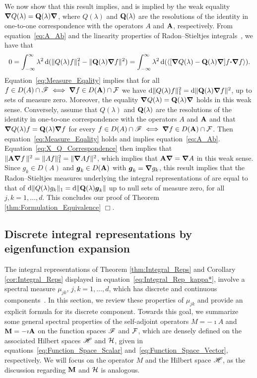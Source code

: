 \documentclass[amsa]{ipart}
\begin{document}
We now show that this result implies, and is implied by the weak
equality $\mbox{\boldmath${\nabla}$} Q(\lambda)=\mathbf{Q}(\lambda)\mbox{\boldmath${\nabla}$} $, where
$Q(\lambda)$ and $\mathbf{Q}(\lambda)$ are the resolutions of the identity in one-to-one
correspondence with the operators $A$ and $\mathbf{A}$, respectively. From
equation~\eqref{eq:A_Ab} and the linearity properties of
Radon--Stieltjes integrals~\cite{Stone:64}, we have that   
%
\begin{align}\label{eq:Measure_Eqality}
  0=\int_{-\infty}^\infty\lambda^2\,\d(\|Q(\lambda)f\|_1^2-\|\Qb(\lambda)\bnabla f\|^2)
   =\int_{-\infty}^\infty\lambda^2\,\d(\langle[\bnabla Q(\lambda)-\Qb(\lambda)\bnabla ]f\bcdot\bnabla f\rangle).
\end{align}
%
Equation~\eqref{eq:Measure_Eqality} implies that for all
$f\in D(A)\cap\mathscr{F}\iff\mbox{\boldmath${\nabla}$} f\in D(\mathbf{A})\cap\mathcal{F}$ we have
$\mathrm{d}\|Q(\lambda)f\|_1^2=\mathrm{d}\|\mathbf{Q}(\lambda)\mbox{\boldmath${\nabla}$} f\|^2$, up to sets of measure
zero. Moreover, the equality $\mbox{\boldmath${\nabla}$} Q(\lambda)=\mathbf{Q}(\lambda)\mbox{\boldmath${\nabla}$} $ holds
in this weak sense. Conversely, assume that $Q(\lambda)$ and 
$\mathbf{Q}(\lambda)$ are the resolutions of the identity in one-to-one
correspondence with the operators $A$ and $\mathbf{A}$ and that $\mbox{\boldmath${\nabla}$}
Q(\lambda)f=\mathbf{Q}(\lambda)\mbox{\boldmath${\nabla}$} f$ for every $f\in D(A)\cap\mathscr{F}\iff\mbox{\boldmath${\nabla}$} f\in D(\mathbf{A})\cap\mathcal{F}$. Then
equation~\eqref{eq:Measure_Eqality} holds and implies
equation~\eqref{eq:A_Ab}. Equation~\eqref{eq:X_Q_Correspondence} then
implies that $\|\mathbf{A}\mbox{\boldmath${\nabla}$} f\,\|^2=\|Af\|_1^2=\|\mbox{\boldmath${\nabla}$} Af\|^2$, which
implies that $\mathbf{A}\mbox{\boldmath${\nabla}$} =\mbox{\boldmath${\nabla}$} A$ in this weak sense. Since 
$g_k\in D(A)$ and $\boldsymbol{g}_k\in D(\mathbf{A})$ with $\boldsymbol{g}_k=\mbox{\boldmath${\nabla}$} g_k$, this result implies
that the Radon--Stieltjes measures underlying the integral
representations of  are equal to that of
 $\mathrm{d}\| Q(\lambda)g_k\|_1=\mathrm{d}\|\mathbf{Q}(\lambda)\boldsymbol{g}_k\|$ up to
null sets of measure zero, for all $j,k=1,\ldots,d$. This concludes our
proof of Theorem \ref{thm:Formulation_Equivalence} $\Box$.     










\subsection{Discrete integral representations by eigenfunction
  expansion} \label{sec:Eig_Funct_Exp}  
%
The integral representations of Theorem \ref{thm:Integral_Reps} and
Corollary \ref{cor:Integral_Reps} 
displayed in equation~\eqref{eq:Integral_Rep_kappa*},  involve a
spectral measure $\mu_{jk}$, $j,k=1,\ldots,d$, which has discrete and
continuous components~\cite{Reed-1980,Stone:64}. In this section, we
review these properties of $\mu_{jk}$ and provide an explicit formula
for its discrete component. Towards this goal, 
we summarize some general spectral properties of the self-adjoint
operators $M=-\imath A$ and $\mathbf{M}=-\imath\mathbf{A}$ on the function spaces $\mathscr{F}$
and $\mathcal{F}$, which are densely defined on the associated Hilbert spaces $\mathscr{H}$
and $\mathcal{H}$, given in equations~\eqref{eq:Function_Space_Scalar}
and~\eqref{eq:Function_Space_Vector}, respectively. We will focus on the
operator $M$ and the Hilbert space $\mathscr{H}$, as the discussion regarding
$\mathbf{M}$ and $\mathcal{H}$ is analogous. 
\end{document}
